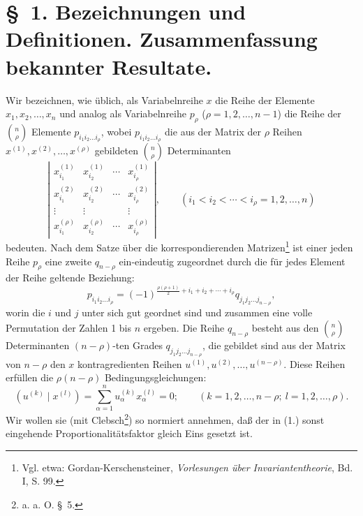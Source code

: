 \section*{\S\ 1. Bezeichnungen und Definitionen. Zusammenfassung bekannter Resultate.}
Wir bezeichnen, wie üblich, als Variabelnreihe $x$ die Reihe der Elemente $x_1,x_2,\ldots,x_n$ und analog als Variabelnreihe $p_\rho$ ($\rho=1,2,\ldots,n-1$) die Reihe der $\binom n\rho$ Elemente $p_{i_1i_2\ldots i_\rho}$, wobei $p_{i_1i_2\ldots i_\rho}$ die aus der Matrix der $\rho$ Reihen $x^{(1)},x^{(2)},\ldots,x^{(\rho)}$ gebildeten $\binom n\rho$ Determinanten
\[
\left|\begin{array}{cccc}
 x_{i_1}^{(1)}&x_{i_2}^{(1)}&\cdots&x_{i_\rho}^{(1)}\\
 x_{i_1}^{(2)}&x_{i_2}^{(2)}&\cdots&x_{i_\rho}^{(2)}\\
 \vdots&\vdots&&\vdots\\
 x_{i_1}^{(\rho)}&x_{i_2}^{(\rho)}&\cdots&x_{i_\rho}^{(\rho)}
\end{array}\right|,
\qquad (i_1<i_2<\cdots<i_\rho=1,2,\ldots,n)
\]
bedeuten. Nach dem Satze über die korrespondierenden Matrizen\footnote{Vgl. etwa: Gordan-Kerschensteiner, \emph{Vorlesungen über Invariantentheorie}, Bd. I, S. 99.} ist einer jeden Reihe $p_\rho$ eine zweite $q_{n-\rho}$ ein-eindeutig zugeordnet durch die für jedes Element der Reihe geltende Beziehung:
\begin{equation}
 p_{i_1i_2\ldots i_\rho}=(-1)^{\frac{\rho(\rho+1)}{2}+i_1+i_2+\cdots+i_\rho}q_{j_1j_2\ldots j_{n-\rho}},
\tag{1}
\end{equation}
worin die $i$ und $j$ unter sich gut geordnet sind und zusammen eine volle Permutation der Zahlen 1 bis $n$ ergeben. Die Reihe $q_{n-\rho}$ besteht aus den $\binom n\rho$ Determinanten $(n-\rho)$-ten Grades $q_{j_1j_2\ldots j_{n-\rho}}$, die gebildet sind aus der Matrix von $n-\rho$ den $x$ kontragredienten Reihen $u^{(1)},u^{(2)},\ldots,u^{(n-\rho)}$. Diese Reihen erfüllen die $\rho(n-\rho)$ Bedingungsgleichungen:
\begin{equation}
 (u^{(k)}\mid x^{(l)})=\sum_{\alpha=1}^{n}u_\alpha^{(k)}x_\alpha^{(l)}=0;
 \qquad (k=1,2,\ldots,n-\rho;\ l=1,2,\ldots,\rho).
\tag{2}
\end{equation}
Wir wollen sie (mit Clebsch\footnote{a. a. O. \S\ 5.}) so normiert annehmen, daß der in (1.) sonst eingehende Proportionalitätsfaktor gleich Eins gesetzt ist.
